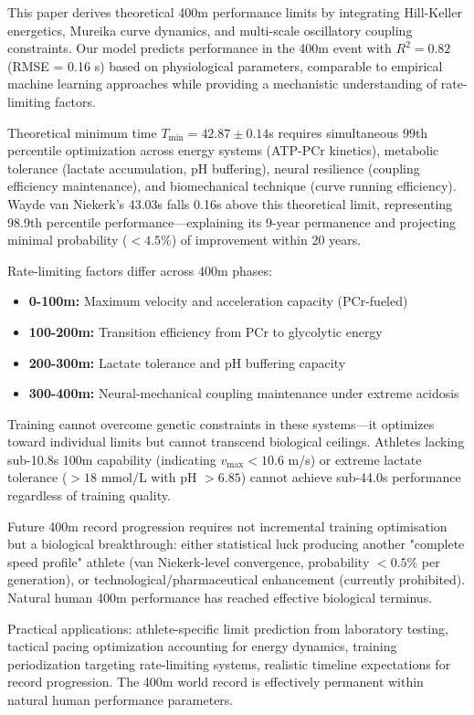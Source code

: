 \documentclass[12pt,a4paper]{article}
\begin{document}
This paper derives theoretical 400m performance limits by integrating Hill-Keller energetics, Mureika curve dynamics, and multi-scale oscillatory coupling constraints. Our model predicts performance in the 400m event with $R^2 = 0.82$ (RMSE = 0.16 s) based on physiological parameters, comparable to empirical machine learning approaches while providing a mechanistic understanding of rate-limiting factors.

Theoretical minimum time $T_{\min} = 42.87 \pm 0.14$s requires simultaneous 99th percentile optimization across energy systems (ATP-PCr kinetics), metabolic tolerance (lactate accumulation, pH buffering), neural resilience (coupling efficiency maintenance), and biomechanical technique (curve running efficiency). Wayde van Niekerk's 43.03s falls 0.16s above this theoretical limit, representing 98.9th percentile performance—explaining its 9-year permanence and projecting minimal probability ($<4.5\%$) of improvement within 20 years.

Rate-limiting factors differ across 400m phases:
\begin{itemize}
    \item \textbf{0-100m:} Maximum velocity and acceleration capacity (PCr-fueled)
    \item \textbf{100-200m:} Transition efficiency from PCr to glycolytic energy
    \item \textbf{200-300m:} Lactate tolerance and pH buffering capacity
    \item \textbf{300-400m:} Neural-mechanical coupling maintenance under extreme acidosis
\end{itemize}

Training cannot overcome genetic constraints in these systems—it optimizes toward individual limits but cannot transcend biological ceilings. Athletes lacking sub-10.8s 100m capability (indicating $v_{\max} < 10.6$ m/s) or extreme lactate tolerance ($>18$ mmol/L with pH $>6.85$) cannot achieve sub-44.0s performance regardless of training quality.

Future 400m record progression requires not incremental training optimisation but a biological breakthrough: either statistical luck producing another "complete speed profile" athlete (van Niekerk-level convergence, probability $<0.5\%$ per generation), or technological/pharmaceutical enhancement (currently prohibited). Natural human 400m performance has reached effective biological terminus.

Practical applications: athlete-specific limit prediction from laboratory testing, tactical pacing optimization accounting for energy dynamics, training periodization targeting rate-limiting systems, realistic timeline expectations for record progression. The 400m world record is effectively permanent within natural human performance parameters.



\end{document}
